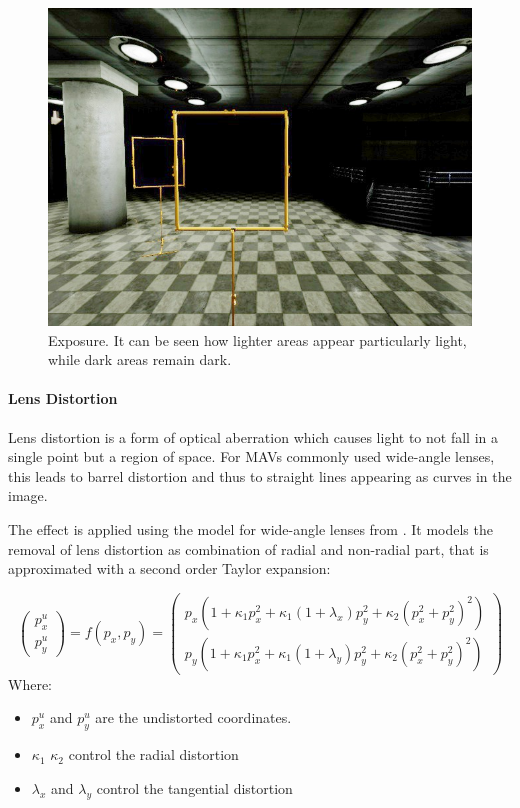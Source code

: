 \begin{figure}[bhtp]
\begin{minipage}{0.33\textwidth}
		\includegraphics[width=\textwidth]{fig/gate_example_exposure}
		\caption{Exposure. It can be seen how lighter areas appear particularly light, while dark areas remain dark.}
		\label{fig:exposure}
	\end{minipage}
\end{figure}


\paragraph{Lens Distortion}

Lens distortion is a form of optical aberration which causes light to not fall in a single point but a region of space. For \acp{MAV} commonly used wide-angle lenses, this leads to barrel distortion and thus to straight lines appearing as curves in the image.

The effect is applied using the model for wide-angle lenses from \cite{Vass}. It models the removal of lens distortion as combination of radial and non-radial part, that is approximated with a second order Taylor expansion:

\begin{equation}
\begin{pmatrix}
p_x^u \\
p_y^u  
\end{pmatrix}=
f(p_x,p_y) =
\begin{pmatrix}
p_x (1 + \kappa_1 p_x^2 + \kappa_1 (1 + \lambda_x) p_y^2 + \kappa_2(p_x^2 + p_y^2)^2) \\
p_y (1 + \kappa_1 p_x^2 + \kappa_1 (1 + \lambda_y) p_y^2 + \kappa_2(p_x^2 + p_y^2)^2)
\end{pmatrix} 
\label{eq:distortion}
\end{equation}
Where:
\begin{itemize}
	\item $p_x^u$ and $p_y^u$ are the undistorted coordinates.
	\item $\kappa_1$ $\kappa_2$ control the radial distortion 
	\item $\lambda_x$ and $\lambda_y$ control the tangential distortion
\end{itemize}

